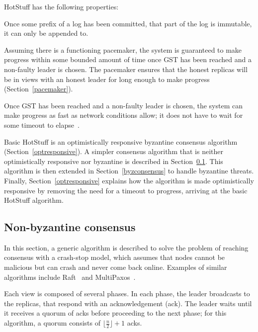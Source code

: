 HotStuff has the following properties:

\begin{property}[Safety] \label{safetyproperty}
	Once some prefix of a log has been committed, that part of the log is immutable, it can only be appended to.
\end{property}

\begin{property}[Liveness] \label{livenessproperty}
	Assuming there is a functioning pacemaker, the system is guaranteed to make progress within some bounded amount of time once GST has been reached and a non-faulty leader is chosen. The pacemaker ensures that the honest replicas will be in views with an honest leader for long enough to make progress (Section~\ref{pacemaker}).
\end{property}

\begin{property} \label{optresponsiveproperty}
	Once GST has been reached and a non-faulty leader is chosen, the system can make progress as fast as network conditions allow; it does not have to wait for some timeout to elapse~\cite{passThunderellaBlockchainsOptimistic2018}.
\end{property}

Basic HotStuff is an optimistically responsive byzantine consensus algorithm (Section~\ref{optresponsive}). A simpler consensus algorithm that is neither optimistically responsive nor byzantine is described in Section~\ref{nonbyzconsensus}. This algorithm is then extended in Section~\ref{byzconsensus} to handle byzantine threats. Finally, Section~\ref{optresponsive} explains how the algorithm is made optimistically responsive by removing the need for a timeout to progress, arriving at the basic HotStuff algorithm.

\subsection{Non-byzantine consensus} \label{nonbyzconsensus}
In this section, a generic algorithm is described to solve the problem of reaching consensus with a crash-stop model, which assumes that nodes cannot be malicious but can crash and never come back online. Examples of similar algorithms include Raft~\cite{ongaroSearchUnderstandableConsensus2014} and \mbox{MultiPaxos~\cite{lamportParttimeParliament1998, lamportPaxosMadeSimple2001}}.

Each view is composed of several phases. In each phase, the leader broadcasts to the replicas, that respond with an acknowledgement (ack). The leader waits until it receives a quorum of acks before proceeding to the next phase; for this algorithm, a quorum consists of $\lfloor\frac{n}{2}\rfloor + 1$ acks.

